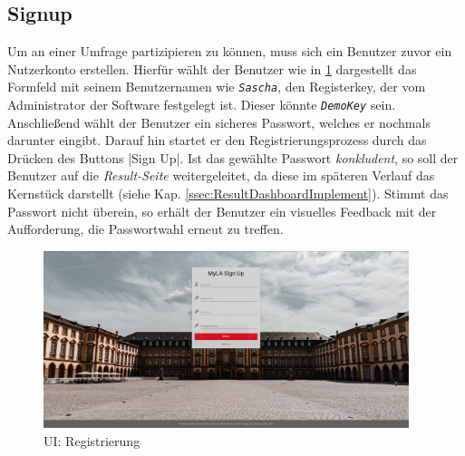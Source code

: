 
\subsection{Signup}
\label{ssec:Signup}

Um an einer Umfrage partizipieren zu können, muss sich ein Benutzer zuvor ein Nutzerkonto erstellen.  
Hierfür wählt der Benutzer wie in \abb \ref{fig:SignupImplement} dargestellt das Formfeld mit seinem Benutzernamen wie \zb \emph{\texttt{Sascha}}, den Registerkey, der vom Administrator der Software festgelegt ist. 
Dieser könnte \emph{\texttt{DemoKey}} sein.
Anschließend wählt der Benutzer ein sicheres Passwort, welches er nochmals darunter eingibt.  
Darauf hin startet er den Registrierungsprozess durch das Drücken des Buttons \jinline|Sign Up|.
Ist das gewählte Passwort \emph{konkludent}, so soll der Benutzer auf die \emph{Result-Seite} weitergeleitet, da diese im späteren Verlauf \ua das Kernstück darstellt (siehe Kap. \vref{ssec:ResultDashboardImplement}). 
Stimmt das Passwort nicht überein, so erhält der Benutzer ein visuelles Feedback mit der Aufforderung, die Passwortwahl erneut zu treffen. 

\begin{figure}[hp]
	\centering
	\includegraphics[width=0.95\textwidth, keepaspectratio]{img/client/Signup.png}
	\captionsetup{justification=centering, format=plain}
	\caption[\acf{UI}: Registrierung]{\acf{UI}: Registrierung \\ \quelleScreenshot}
	\label{fig:SignupImplement}
\end{figure}